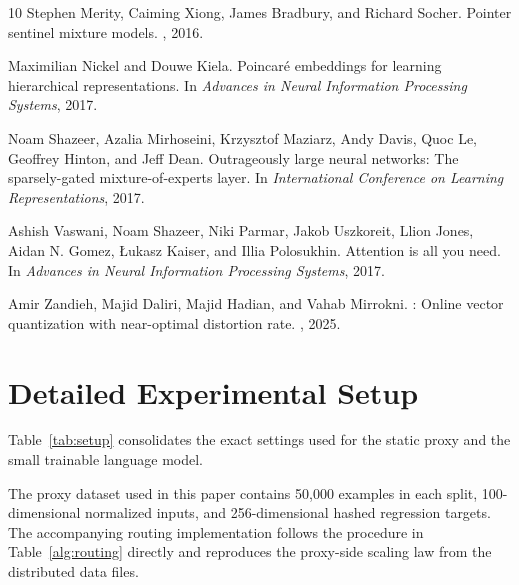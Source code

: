 \documentclass[10pt,letterpaper]{article}
\begin{document}
\begin{thebibliography}{10}
Stephen Merity, Caiming Xiong, James Bradbury, and Richard Socher.
\newblock Pointer sentinel mixture models.
, 2016.

Maximilian Nickel and Douwe Kiela.
\newblock Poincar{\'e} embeddings for learning hierarchical representations.
\newblock In {\em Advances in Neural Information Processing Systems}, 2017.

Noam Shazeer, Azalia Mirhoseini, Krzysztof Maziarz, Andy Davis, Quoc Le, Geoffrey Hinton, and Jeff Dean.
\newblock Outrageously large neural networks: The sparsely-gated mixture-of-experts layer.
\newblock In {\em International Conference on Learning Representations}, 2017.

Ashish Vaswani, Noam Shazeer, Niki Parmar, Jakob Uszkoreit, Llion Jones, Aidan N. Gomez, {\L}ukasz Kaiser, and Illia Polosukhin.
\newblock Attention is all you need.
\newblock In {\em Advances in Neural Information Processing Systems}, 2017.

Amir Zandieh, Majid Daliri, Majid Hadian, and Vahab Mirrokni.
: Online vector quantization with near-optimal distortion rate.
, 2025.

\end{thebibliography}

\clearpage
\appendix

\section{Detailed Experimental Setup}
\label{app:setup}
Table~\ref{tab:setup} consolidates the exact settings used for the static proxy and the small trainable language model.

\begin{table}[H]
  \centering
  \caption{Exact settings for the experiments reported in the paper.}
  \label{tab:setup}
  \small
  
\end{table}

The proxy dataset used in this paper contains 50{,}000 examples in each split, 100-dimensional normalized inputs, and 256-dimensional hashed regression targets. The accompanying routing implementation follows the procedure in Table~\ref{alg:routing} directly and reproduces the proxy-side scaling law from the distributed data files.
\end{document}
